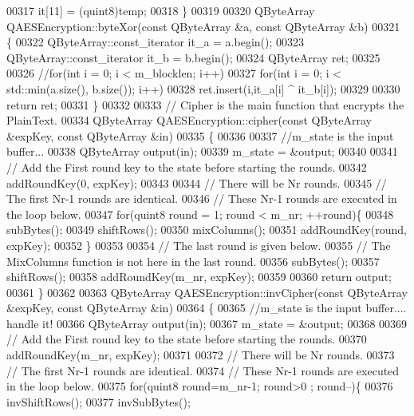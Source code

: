 \begin{DoxyCode}
00317     it[11] = (quint8)temp;
00318 \}
00319 
00320 QByteArray QAESEncryption::byteXor(\textcolor{keyword}{const} QByteArray &a, \textcolor{keyword}{const} QByteArray &b)
00321 \{
00322   QByteArray::const\_iterator it\_a = a.begin();
00323   QByteArray::const\_iterator it\_b = b.begin();
00324   QByteArray ret;
00325 
00326   \textcolor{comment}{//for(int i = 0; i < m\_blocklen; i++)}
00327   \textcolor{keywordflow}{for}(\textcolor{keywordtype}{int} i = 0; i < std::min(a.size(), b.size()); i++)
00328       ret.insert(i,it\_a[i] ^ it\_b[i]);
00329 
00330   \textcolor{keywordflow}{return} ret;
00331 \}
00332 
00333 \textcolor{comment}{// Cipher is the main function that encrypts the PlainText.}
00334 QByteArray QAESEncryption::cipher(\textcolor{keyword}{const} QByteArray &expKey, \textcolor{keyword}{const} QByteArray &in)
00335 \{
00336 
00337   \textcolor{comment}{//m\_state is the input buffer...}
00338   QByteArray output(in);
00339   m\_state = &output;
00340 
00341   \textcolor{comment}{// Add the First round key to the state before starting the rounds.}
00342   addRoundKey(0, expKey);
00343 
00344   \textcolor{comment}{// There will be Nr rounds.}
00345   \textcolor{comment}{// The first Nr-1 rounds are identical.}
00346   \textcolor{comment}{// These Nr-1 rounds are executed in the loop below.}
00347   \textcolor{keywordflow}{for}(quint8 round = 1; round < m\_nr; ++round)\{
00348     subBytes();
00349     shiftRows();
00350     mixColumns();
00351     addRoundKey(round, expKey);
00352   \}
00353 
00354   \textcolor{comment}{// The last round is given below.}
00355   \textcolor{comment}{// The MixColumns function is not here in the last round.}
00356   subBytes();
00357   shiftRows();
00358   addRoundKey(m\_nr, expKey);
00359 
00360   \textcolor{keywordflow}{return} output;
00361 \}
00362 
00363 QByteArray QAESEncryption::invCipher(\textcolor{keyword}{const} QByteArray &expKey, \textcolor{keyword}{const} QByteArray &in)
00364 \{
00365     \textcolor{comment}{//m\_state is the input buffer.... handle it!}
00366     QByteArray output(in);
00367     m\_state = &output;
00368 
00369     \textcolor{comment}{// Add the First round key to the state before starting the rounds.}
00370     addRoundKey(m\_nr, expKey);
00371 
00372     \textcolor{comment}{// There will be Nr rounds.}
00373     \textcolor{comment}{// The first Nr-1 rounds are identical.}
00374     \textcolor{comment}{// These Nr-1 rounds are executed in the loop below.}
00375     \textcolor{keywordflow}{for}(quint8 round=m\_nr-1; round>0 ; round--)\{
00376         invShiftRows();
00377         invSubBytes();

\end{DoxyCode}
